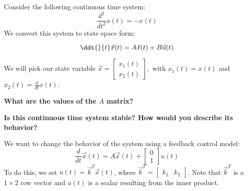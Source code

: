 

Consider the following continuous time system:
$$
\frac{d^2}{dt^2} x(t) = -x(t)
$$
We convert this system to state space form:

\begin{equation}
  \ddt{}{t} \vec{x}(t) = A \vec{x}(t) + B \vec{u}(t)
\end{equation}

We will pick our state variable $\vec{x} = \begin{bmatrix} x_1(t) \\ x_2(t) \end{bmatrix},$
with $x_1(t) = x(t)$ and $x_2(t) = \frac{d}{dt} x(t)$. 

\begin{enumerate}

\qitem \textbf{What are the values of the $A$ matrix?}

\ws{\vspace{75px}}



\qitem \textbf{Is this continuous time system stable? How would you describe its behavior?}

\ws{\vspace{75px}}

\end{enumerate}

We want to change the behavior of the system using a feedback control model:
$$
\frac{d}{dt}
\vec{x}(t)
=
A
\vec{x}(t)
+ 
\begin{bmatrix}
0 \\
1
\end{bmatrix}
u(t)
$$
To do this, we set $u(t) = \vec{k}^T\vec{x}(t)$, where $\vec{k}^T = \begin{bmatrix} k_1 & k_2 \end{bmatrix}$. Note that $\vec{k}^T$ is a $1 \times 2$ row vector and $u(t)$ is a scalar resulting from the inner product.

